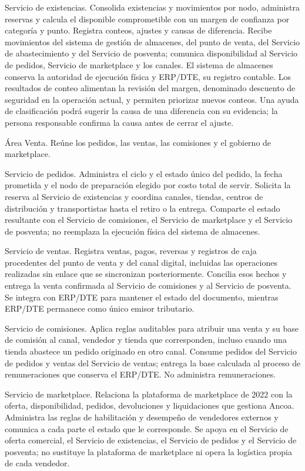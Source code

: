 \documentclass[11pt]{article}
\begin{document}
{Servicio de existencias. Consolida existencias y movimientos por nodo, administra reservas y calcula el disponible comprometible con un margen de confianza por categoría y punto. Registra conteos, ajustes y causas de diferencia. Recibe movimientos del sistema de gestión de almacenes, del punto de venta, del Servicio de abastecimiento y del Servicio de posventa; comunica disponibilidad al Servicio de pedidos, Servicio de marketplace y los canales. El sistema de almacenes conserva la autoridad de ejecución física y ERP/DTE, su registro contable. Los resultados de conteo alimentan la revisión del margen, denominado descuento de seguridad en la operación actual, y permiten priorizar nuevos conteos. Una ayuda de clasificación podrá sugerir la causa de una diferencia con su evidencia; la persona responsable confirma la causa antes de cerrar el ajuste.}

{Área Venta. Reúne los pedidos, las ventas, las comisiones y el gobierno de marketplace.}

{Servicio de pedidos. Administra el ciclo y el estado único del pedido, la fecha prometida y el nodo de preparación elegido por costo total de servir. Solicita la reserva al Servicio de existencias y coordina canales, tiendas, centros de distribución y transportistas hasta el retiro o la entrega. Comparte el estado resultante con el Servicio de comisiones, el Servicio de marketplace y el Servicio de posventa; no reemplaza la ejecución física del sistema de almacenes.}

{Servicio de ventas. Registra ventas, pagos, reversas y registros de caja procedentes del punto de venta y del canal digital, incluidas las operaciones realizadas sin enlace que se sincronizan posteriormente. Concilia esos hechos y entrega la venta confirmada al Servicio de comisiones y al Servicio de posventa. Se integra con ERP/DTE para mantener el estado del documento, mientras ERP/DTE permanece como único emisor tributario.}

{Servicio de comisiones. Aplica reglas auditables para atribuir una venta y su base de comisión al canal, vendedor y tienda que corresponden, incluso cuando una tienda abastece un pedido originado en otro canal. Consume pedidos del Servicio de pedidos y ventas del Servicio de ventas; entrega la base calculada al proceso de remuneraciones que conserva el ERP/DTE. No administra remuneraciones.}

{Servicio de marketplace. Relaciona la plataforma de marketplace de 2022 con la oferta, disponibilidad, pedidos, devoluciones y liquidaciones que gestiona Ancoa. Administra las reglas de habilitación y desempeño de vendedores externos y comunica a cada parte el estado que le corresponde. Se apoya en el Servicio de oferta comercial, el Servicio de existencias, el Servicio de pedidos y el Servicio de posventa; no sustituye la plataforma de marketplace ni opera la logística propia de cada vendedor.}
\end{document}
